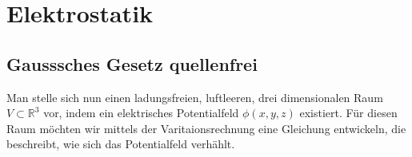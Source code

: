 %
%
%
%
\section{Elektrostatik}


\subsection{Gausssches Gesetz quellenfrei
	\label{maxwell:section:elektrostatik_ohne_quelle}}
Man stelle sich nun einen ladungsfreien, luftleeren, drei dimensionalen Raum $V\subset\mathbb{R}^3$
vor, indem ein elektrisches Potentialfeld $\phi(x,y,z)$ existiert.
Für diesen Raum möchten wir mittels der Varitaionsrechnung eine Gleichung entwickeln, die beschreibt, wie sich das Potentialfeld verhählt. 

